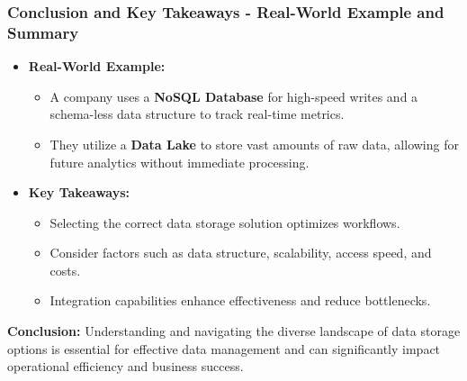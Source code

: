 \documentclass[aspectratio=169]{beamer}
\begin{document}
\begin{frame}[fragile]
    \frametitle{Conclusion and Key Takeaways - Real-World Example and Summary}
    \begin{itemize}
        \item \textbf{Real-World Example:}
        \begin{itemize}
            \item A company uses a \textbf{NoSQL Database} for high-speed writes and a schema-less data structure to track real-time metrics.
            \item They utilize a \textbf{Data Lake} to store vast amounts of raw data, allowing for future analytics without immediate processing.
        \end{itemize}
        
        \item \textbf{Key Takeaways:}
        \begin{itemize}
            \item Selecting the correct data storage solution optimizes workflows.
            \item Consider factors such as data structure, scalability, access speed, and costs.
            \item Integration capabilities enhance effectiveness and reduce bottlenecks.
        \end{itemize}
    \end{itemize}
    
    \textbf{Conclusion:} Understanding and navigating the diverse landscape of data storage options is essential for effective data management and can significantly impact operational efficiency and business success.
\end{frame}
\end{document}
